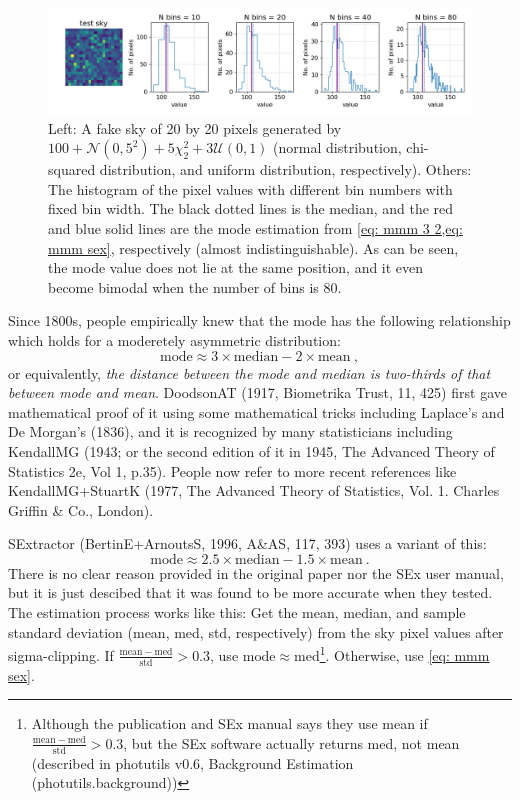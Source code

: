 \begin{figure}[ht!]
\centering
\includegraphics[width=\linewidth]{figs/phot_testsky01}
\caption{Left: A fake sky of 20 by 20 pixels generated by $ 100 + \mathcal{N}(0, 5^2) + 5 \chi^2_2 + 3 \mathcal{U}(0, 1) $ (normal distribution, chi-squared distribution, and uniform distribution, respectively). Others: The histogram of the pixel values with different bin numbers with fixed bin width. The black dotted lines is the median, and the red and blue solid lines are the mode estimation from \cref{eq: mmm 3 2,eq: mmm sex}, respectively (almost indistinguishable). As can be seen, the mode value does not lie at the same position, and it even become bimodal when the number of bins is 80.}
\label{fig:phottestsky01}
\end{figure}

Since 1800s, people empirically knew that the mode has the following relationship which holds for a moderetely asymmetric distribution:
\begin{equation}\label{eq: mmm 3 2}
  \mathrm{mode} \approx 3 \times \mathrm{median} - 2 \times \mathrm{mean} ~,
\end{equation}
or equivalently, \textit{the distance between the mode and median is two-thirds of that between mode and mean}. DoodsonAT (1917, Biometrika Trust, 11, 425) first gave mathematical proof of it using some mathematical tricks including Laplace's and De Morgan's (1836), and it is recognized by many statisticians including KendallMG (1943; or the second edition of it in 1945, The Advanced Theory of Statistics 2e, Vol 1, p.35). People now refer to more recent references like KendallMG+StuartK (1977, The Advanced Theory of Statistics, Vol. 1. Charles Griffin \& Co., London).

SExtractor (BertinE+ArnoutsS, 1996, A\&AS, 117, 393) uses a variant of this:
\begin{equation}\label{eq: mmm sex}
  \mathrm{mode} \approx 2.5 \times \mathrm{median} - 1.5 \times \mathrm{mean} ~.
\end{equation}
There is no clear reason provided in the original paper nor the SEx user manual, but it is just descibed that it was found to be more accurate when they tested. The estimation process works like this: Get the mean, median, and sample standard deviation (mean, med, std, respectively) from the sky pixel values after sigma-clipping. If $ \frac{\mathrm{mean} - \mathrm{med}}{\mathrm{std}} > 0.3 $, use $ \mathrm{mode} \approx \mathrm{med} $\footnote{Although the publication and SEx manual says they use mean if $ \frac{\mathrm{mean} - \mathrm{med}}{\mathrm{std}} > 0.3 $, but the SEx software actually returns med, not mean (described in photutils v0.6, Background Estimation (photutils.background))}. Otherwise, use \cref{eq: mmm sex}. 

